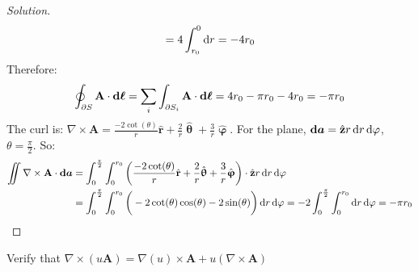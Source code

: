 \begin{proof}[Solution]
\begin{equation*}
                    =4\int_{r_{0}}^{0}\mathop{}\!\mathrm{d}{r}
                    =-4r_{0}
                \end{equation*}
                Therefore:
                \begin{equation*}
                    \oint_{\partial S}
                    \mathbf{A}\cdot\boldsymbol{\mathop{}\!\mathrm{d}{\ell}}
                    =\sum_{i}\int_{\partial S_{i}}
                    \mathbf{A}\cdot\boldsymbol{\mathop{}\!\mathrm{d}{\ell}}
                    =4r_{0}-\pi{r}_{0}-4r_{0}
                    =-\pi r_{0}
                \end{equation*}
                The curl is:
                $\nabla\times\mathbf{A}%
                 =\frac{-2\cot(\theta)}{r}\hat{\mathbf{r}}%
                 +\frac{2}{r}\hat{\boldsymbol{\uptheta}}%
                 +\frac{3}{r}\hat{\boldsymbol{\upvarphi}}$.
                For the plane,
                $\boldsymbol{\diff{a}}%
                 =\hat{\mathbf{z}}r\diff{r}\diff{\varphi}$,
                $\theta=\frac{\pi}{2}$. So:
                \begin{align*}
                    \iint\nabla\times
                    \mathbf{A}\cdot\boldsymbol{\mathop{}\!\mathrm{d}{a}}
                    &=\int_{0}^{\frac{\pi}{2}}\int_{0}^{r_{0}}
                    \bigg(
                        \frac{-2\cot(\theta)}{r}\hat{\mathbf{r}}
                        +\frac{2}{r}\hat{\boldsymbol{\uptheta}}
                        +\frac{3}{r}\hat{\boldsymbol{\upvarphi}}
                    \bigg)
                    \cdot\hat{\mathbf{z}}r\mathop{}\!\mathrm{d}{r}\mathop{}\!\mathrm{d}{\varphi}\\
                    &=\int_{0}^{\frac{\pi}{2}}\int_{0}^{r_{0}}
                    \bigg(
                        -2\cot(\theta)\cos(\theta)
                        -2\sin(\theta)
                    \bigg)\mathop{}\!\mathrm{d}{r}\mathop{}\!\mathrm{d}{\varphi}
                    =-2\int_{0}^{\frac{\pi}{2}}
                    \int_{0}^{r_{0}}\mathop{}\!\mathrm{d}{r}\mathop{}\!\mathrm{d}{\varphi}
                    =-\pi r_{0}
                \end{align*}
            \end{proof}
            \begin{problem}[Wangsness 1-24]
                Verify that
                $\nabla\times(u\mathbf{A})%
                 =\nabla(u)\times\mathbf{A}%
                 +u(\nabla\times\mathbf{A})$
            \end{problem}
